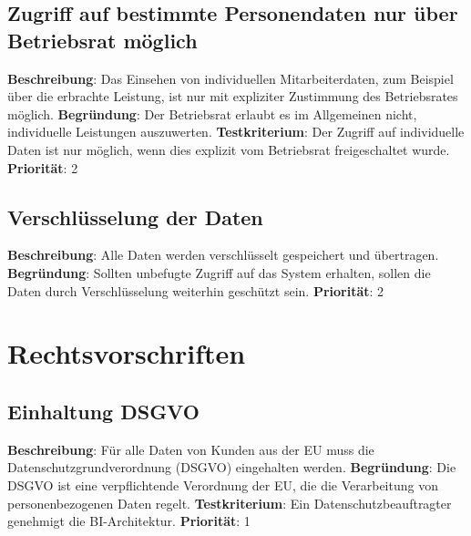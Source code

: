 \subsection{Zugriff auf bestimmte Personendaten nur über Betriebsrat möglich} \label{sec:anforderungsspezifikation:ZugriffMitBetriebsrat}
\textbf{Beschreibung}: Das Einsehen von individuellen Mitarbeiterdaten, zum Beispiel über die erbrachte Leistung, ist nur mit expliziter Zustimmung des Betriebsrates möglich.
\newline \textbf{Begründung}: Der Betriebsrat erlaubt es im Allgemeinen nicht, individuelle Leistungen auszuwerten.
\newline \textbf{Testkriterium}: Der Zugriff auf individuelle Daten ist nur möglich, wenn dies explizit vom Betriebsrat freigeschaltet wurde. 
\newline \textbf{Priorität}: 2

\subsection{Verschlüsselung der Daten} \label{sec:anforderungsspezifikation:verschlüsselung}
\textbf{Beschreibung}: Alle Daten werden verschlüsselt gespeichert und übertragen.
\newline \textbf{Begründung}: Sollten unbefugte Zugriff auf das System erhalten, sollen die Daten durch Verschlüsselung weiterhin geschützt sein.
\newline \textbf{Priorität}: 2

\section{Rechtsvorschriften} \label{sec:anforderungsspezifikation:rechtsvorschriften}

\subsection{Einhaltung DSGVO} \label{sec:anforderungsspezifikation:dsgvo}
\textbf{Beschreibung}: Für alle Daten von Kunden aus der EU muss die Datenschutzgrundverordnung (DSGVO) eingehalten werden.
\newline \textbf{Begründung}: Die DSGVO ist eine verpflichtende Verordnung der EU, die die Verarbeitung von personenbezogenen Daten regelt.
\newline \textbf{Testkriterium}: Ein Datenschutzbeauftragter genehmigt die BI-Architektur.
\newline \textbf{Priorität}: 1